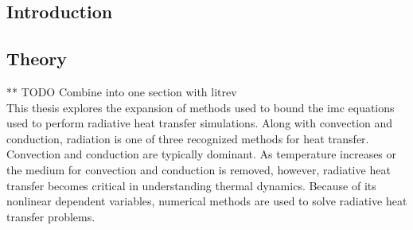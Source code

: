 \begin{center}
\section{Introduction}
\end{center}
\subsection{Theory}
** TODO Combine into one section with litrev \\
%
This thesis explores the expansion of methods used to bound the \gls{imc} equations used to perform radiative heat transfer simulations.  Along with convection and conduction, radiation  is one of three recognized methods for heat transfer.  Convection and conduction are typically dominant.  As temperature increases or the medium for convection and conduction is removed, however, radiative heat transfer becomes critical in understanding thermal dynamics.  Because of its nonlinear dependent variables, numerical methods are used to solve radiative heat transfer problems.

